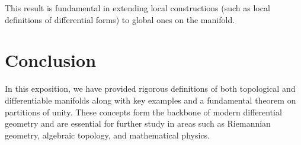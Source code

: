 \documentclass[11pt]{amsart}
\theoremstyle{definition}
\begin{document}
This result is fundamental in extending local constructions (such as local definitions of differential forms) to global ones on the manifold.

\section{Conclusion}
In this exposition, we have provided rigorous definitions of both topological and differentiable manifolds along with key examples and a fundamental theorem on partitions of unity. These concepts form the backbone of modern differential geometry and are essential for further study in areas such as Riemannian geometry, algebraic topology, and mathematical physics.
\end{document}
